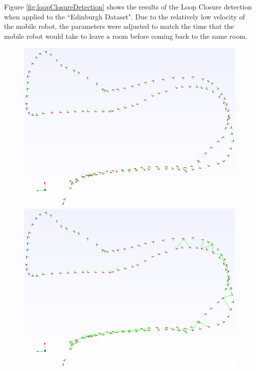\documentclass[11pt]{article}
\begin{document}
Figure \ref{fig:loopClosureDetection} shows the results of the Loop Closure detection when applied to the ``Edinburgh Dataset". Due to the relatively low velocity of the mobile robot, the parameters were adjusted to match the time that the mobile robot would take to leave a room before coming back to the same room.

\begin{figure}
\begin{minipage}{0.67\textwidth}
\centering
\includegraphics[width=\textwidth]{LoopClosureTimeSampling}
\includegraphics[width=\textwidth]{LoopClosureEuclideanSampling}

\end{minipage}
\end{figure}
\end{document}
